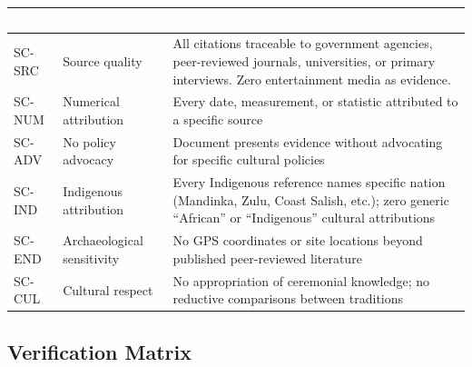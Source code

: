 \documentclass[11pt,letterpaper]{article}
\newcommand{\tableheader}[1]{\textbf{\sffamily\textcolor{white}{#1}}}
\begin{document}
\begin{center}
\begin{tabularx}{\textwidth}{C{1.3cm}L{3.5cm}X}
\toprule
{}
\tableheader{ID} & \tableheader{Verifies} & \tableheader{Expected Behavior} \\
\midrule
SC-SRC & Source quality & All citations traceable to government agencies, peer-reviewed journals, universities, or primary interviews. Zero entertainment media as evidence. \\
SC-NUM & Numerical attribution & Every date, measurement, or statistic attributed to a specific source \\
SC-ADV & No policy advocacy & Document presents evidence without advocating for specific cultural policies \\
SC-IND & Indigenous attribution & Every Indigenous reference names specific nation (Mandinka, Zulu, Coast Salish, etc.); zero generic ``African'' or ``Indigenous'' cultural attributions \\
SC-END & Archaeological sensitivity & No GPS coordinates or site locations beyond published peer-reviewed literature \\
SC-CUL & Cultural respect & No appropriation of ceremonial knowledge; no reductive comparisons between traditions \\
\bottomrule
\end{tabularx}
\end{center}

\subsection{Verification Matrix}
\end{document}
